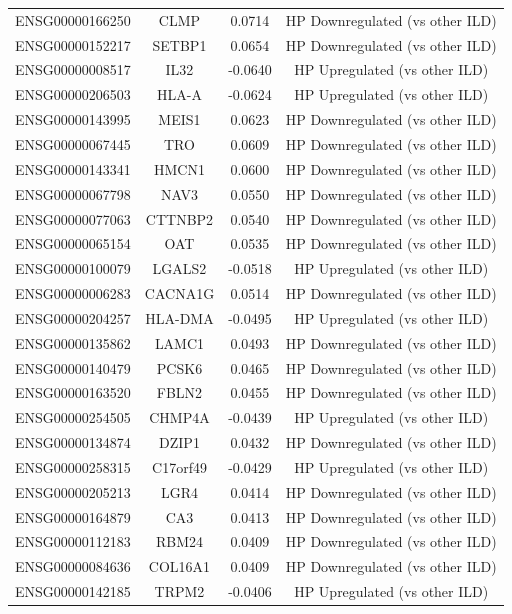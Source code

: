 \documentclass[
]{article}
\begin{document}
\begin{singlespace}
\begin{longtable}[t]{lccc}
ENSG00000166250 & CLMP & 0.0714 & HP Downregulated (vs other ILD)\\
ENSG00000152217 & SETBP1 & 0.0654 & HP Downregulated (vs other ILD)\\
\addlinespace
ENSG00000008517 & IL32 & -0.0640 & HP Upregulated (vs other ILD)\\
ENSG00000206503 & HLA-A & -0.0624 & HP Upregulated (vs other ILD)\\
ENSG00000143995 & MEIS1 & 0.0623 & HP Downregulated (vs other ILD)\\
ENSG00000067445 & TRO & 0.0609 & HP Downregulated (vs other ILD)\\
ENSG00000143341 & HMCN1 & 0.0600 & HP Downregulated (vs other ILD)\\
\addlinespace
ENSG00000067798 & NAV3 & 0.0550 & HP Downregulated (vs other ILD)\\
ENSG00000077063 & CTTNBP2 & 0.0540 & HP Downregulated (vs other ILD)\\
ENSG00000065154 & OAT & 0.0535 & HP Downregulated (vs other ILD)\\
ENSG00000100079 & LGALS2 & -0.0518 & HP Upregulated (vs other ILD)\\
ENSG00000006283 & CACNA1G & 0.0514 & HP Downregulated (vs other ILD)\\
\addlinespace
ENSG00000204257 & HLA-DMA & -0.0495 & HP Upregulated (vs other ILD)\\
ENSG00000135862 & LAMC1 & 0.0493 & HP Downregulated (vs other ILD)\\
ENSG00000140479 & PCSK6 & 0.0465 & HP Downregulated (vs other ILD)\\
ENSG00000163520 & FBLN2 & 0.0455 & HP Downregulated (vs other ILD)\\
ENSG00000254505 & CHMP4A & -0.0439 & HP Upregulated (vs other ILD)\\
\addlinespace
ENSG00000134874 & DZIP1 & 0.0432 & HP Downregulated (vs other ILD)\\
ENSG00000258315 & C17orf49 & -0.0429 & HP Upregulated (vs other ILD)\\
ENSG00000205213 & LGR4 & 0.0414 & HP Downregulated (vs other ILD)\\
ENSG00000164879 & CA3 & 0.0413 & HP Downregulated (vs other ILD)\\
ENSG00000112183 & RBM24 & 0.0409 & HP Downregulated (vs other ILD)\\
\addlinespace
ENSG00000084636 & COL16A1 & 0.0409 & HP Downregulated (vs other ILD)\\
ENSG00000142185 & TRPM2 & -0.0406 & HP Upregulated (vs other ILD)\\

\end{longtable}
\end{singlespace}
\end{document}
